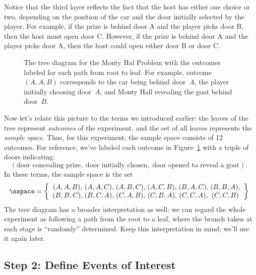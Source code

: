 Notice that the third layer reflects the fact that the host has either one
choice or two, depending on the position of the car and the door initially
selected by the player.  For example, if the prize is behind door A and
the player picks door B, then the host must open door C.  However, if the
prize is behind door A and the player picks door A, then the host could
open either door B or door C.

\begin{figure}


\caption{The tree diagram for the Monty Hal Problem with the outcomes
  labeled for each path from root to leaf.  For example, outcome $(A,
  A, B)$ corresponds to the car being behind door~$A$, the player
  initially choosing door~$A$, and Monty Hall revealing the goat
  behind door~$B$.}

\label{fig:14A3}

\end{figure}

Now let's relate this picture to the terms we introduced earlier: the
leaves of the tree represent \emph{outcomes} of the experiment, and
the set of all leaves represents the \emph{sample space}.  Thus, for
this experiment, the sample space consists of 12 outcomes.  For
reference, we've labeled each outcome in Figure~\ref{fig:14A3} with a
triple of doors indicating:
%
\[
    (\text{door concealing prize}, \;
    \text{door initially chosen}, \;
     \text{door opened to reveal a goat}).
\]
%
In these terms, the sample space is the set
%
\[
\sspace = \left\{
\begin{array}{c@{\;}c@{\;}c@{\;}c@{\;}c@{\;}c}
(A, A, B), & (A, A, C), & (A, B, C), & (A, C, B), & (B, A, C), & (B, B, A), \\
(B, B, C), & (B, C, A), & (C, A, B), & (C, B, A), & (C, C, A), & (C, C, B)
\end{array}
\right\}
\]
%
The tree diagram has a broader interpretation as well: we can regard the
whole experiment as following a path from the root to a leaf, where the
branch taken at each stage is ``randomly'' determined.  Keep this
interpretation in mind; we'll use it again later.

\subsection{Step 2: Define Events of Interest}

